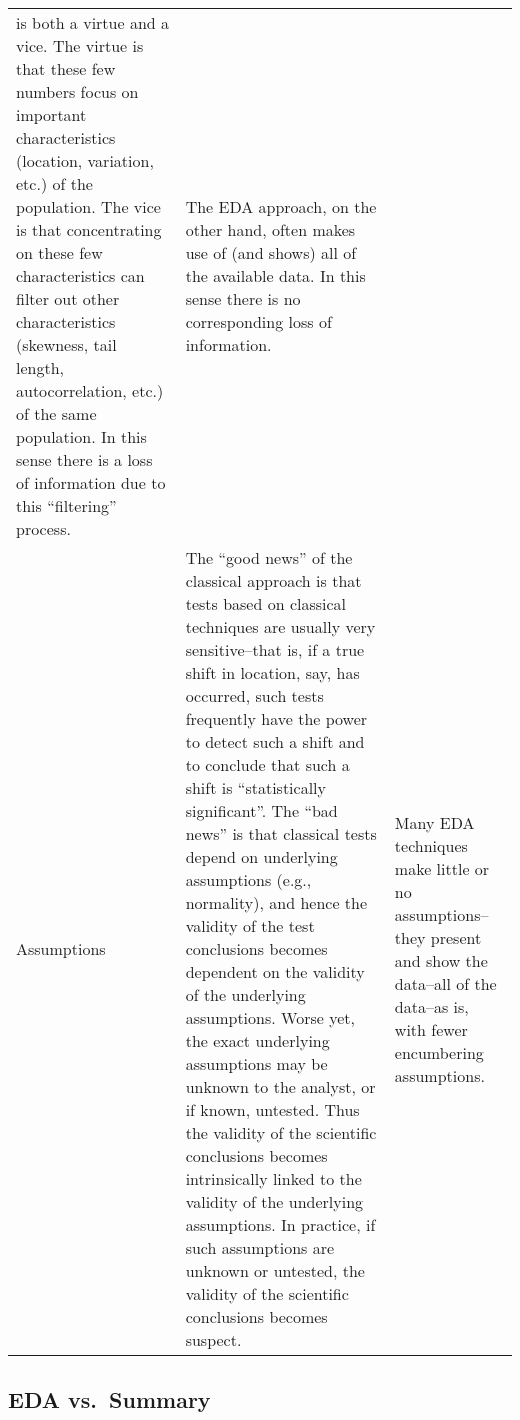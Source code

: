 \documentclass[]{book}
\theoremstyle{definition}
\theoremstyle{definition}
\theoremstyle{definition}
\theoremstyle{remark}
\begin{document}
\begin{longtable}[]{@{}lll@{}}
\begin{minipage}[t]{0.39\columnwidth}
is both a virtue and a vice. The virtue is that these few numbers focus
on important characteristics (location, variation, etc.) of the
population. The vice is that concentrating on these few characteristics
can filter out other characteristics (skewness, tail length,
autocorrelation, etc.) of the same population. In this sense there is a
loss of information due to this ``filtering'' process.\strut
\end{minipage} & \begin{minipage}[t]{0.39\columnwidth}\raggedright\strut
The EDA approach, on the other hand, often makes use of (and shows) all
of the available data. In this sense there is no corresponding loss of
information.\strut
\end{minipage}\tabularnewline
\begin{minipage}[t]{0.14\columnwidth}\raggedright\strut
Assumptions\strut
\end{minipage} & \begin{minipage}[t]{0.39\columnwidth}\raggedright\strut
The ``good news'' of the classical approach is that tests based on
classical techniques are usually very sensitive--that is, if a true
shift in location, say, has occurred, such tests frequently have the
power to detect such a shift and to conclude that such a shift is
``statistically significant''. The ``bad news'' is that classical tests
depend on underlying assumptions (e.g., normality), and hence the
validity of the test conclusions becomes dependent on the validity of
the underlying assumptions. Worse yet, the exact underlying assumptions
may be unknown to the analyst, or if known, untested. Thus the validity
of the scientific conclusions becomes intrinsically linked to the
validity of the underlying assumptions. In practice, if such assumptions
are unknown or untested, the validity of the scientific conclusions
becomes suspect.\strut
\end{minipage} & \begin{minipage}[t]{0.39\columnwidth}\raggedright\strut
Many EDA techniques make little or no assumptions--they present and show
the data--all of the data--as is, with fewer encumbering
assumptions.\strut
\end{minipage}\tabularnewline
\bottomrule
\end{longtable}

\subsection{EDA vs.~Summary}\label{eda-vs.summary}
\end{document}
